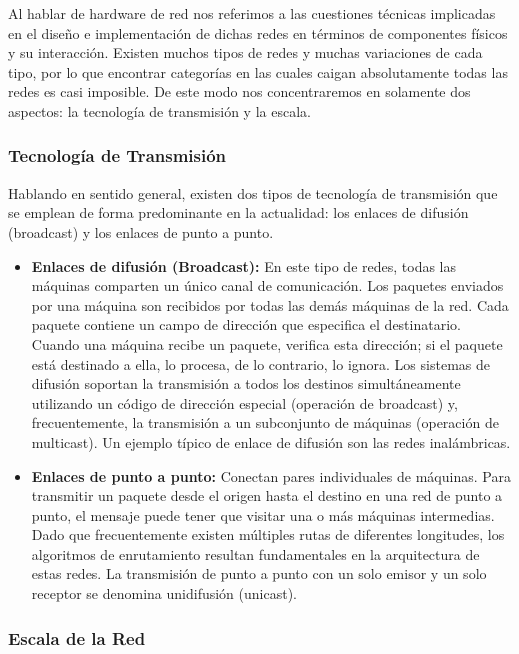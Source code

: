 Al hablar de hardware de red nos referimos a las cuestiones técnicas implicadas en el diseño e implementación de dichas redes en términos de componentes físicos y su interacción. Existen muchos tipos de redes y muchas variaciones de cada tipo, por lo que encontrar categorías en las cuales caigan absolutamente todas las redes es casi imposible. De este modo nos concentraremos en solamente dos aspectos: la tecnología de transmisión y la escala.

\subsubsection{Tecnología de Transmisión}

Hablando en sentido general, existen dos tipos de tecnología de transmisión que se emplean de forma predominante en la actualidad: los enlaces de difusión (broadcast) y los enlaces de punto a punto.

\begin{itemize}
  \item \textbf{Enlaces de difusión (Broadcast):} 
  En este tipo de redes, todas las máquinas comparten un único canal de comunicación. Los paquetes enviados por una máquina son recibidos por todas las demás máquinas de la red. Cada paquete contiene un campo de dirección que especifica el destinatario. Cuando una máquina recibe un paquete, verifica esta dirección; si el paquete está destinado a ella, lo procesa, de lo contrario, lo ignora. Los sistemas de difusión soportan la transmisión a todos los destinos simultáneamente utilizando un código de dirección especial (operación de broadcast) y, frecuentemente, la transmisión a un subconjunto de máquinas (operación de multicast). Un ejemplo típico de enlace de difusión son las redes inalámbricas.

  \item \textbf{Enlaces de punto a punto:} 
  Conectan pares individuales de máquinas. Para transmitir un paquete desde el origen hasta el destino en una red de punto a punto, el mensaje puede tener que visitar una o más máquinas intermedias. Dado que frecuentemente existen múltiples rutas de diferentes longitudes, los algoritmos de enrutamiento resultan fundamentales en la arquitectura de estas redes. La transmisión de punto a punto con un solo emisor y un solo receptor se denomina unidifusión (unicast).
\end{itemize}

\subsubsection{Escala de la Red}

